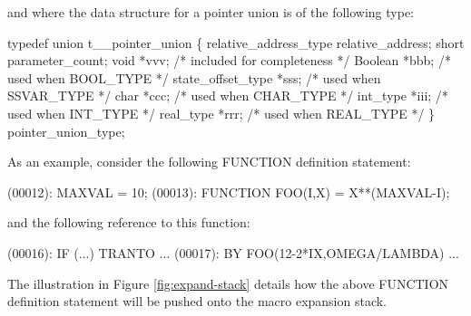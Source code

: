 and where the data structure for a pointer union is of the following type:
\begin{codeexample}
typedef union t__pointer_union
   \{
     relative_address_type relative_address;
     short parameter_count;
     void *vvv;               /* included for completeness */
     Boolean *bbb;            /* used when BOOL_TYPE */
     state_offset_type *sss;  /* used when SSVAR_TYPE */
     char *ccc;               /* used when CHAR_TYPE */
     int_type *iii;           /* used when INT_TYPE */
     real_type *rrr;          /* used when REAL_TYPE */
   \} pointer_union_type;
\end{codeexample}



As an example, consider the following FUNCTION definition statement:
\begin{logfileexample}
(00012): MAXVAL = 10;
(00013): FUNCTION FOO(I,X) = X**(MAXVAL-I);
\end{logfileexample}

and the following reference to this function:
\begin{logfileexample}
(00016): IF (...) TRANTO ...
(00017):    BY FOO(12-2*IX,OMEGA/LAMBDA) ...
\end{logfileexample}

The illustration in Figure \ref{fig:expand-stack}
details how the above FUNCTION definition
statement will be pushed onto the macro expansion stack.

